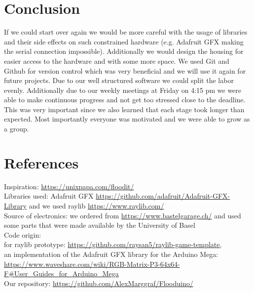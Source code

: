 \documentclass[10pt, a4paper]{article}
\begin{document}
\section*{Conclusion}

If we could start over again we would be more careful with the usage of libraries and their side effects on such constrained hardware (e.g. Adafruit GFX making the serial connection impossible). 
Additionally we would design the housing for easier access to the hardware and with some more space. We used Git and Github for version control which was very beneficial and we will use it again for future projects. Due to our well structured software we could split the labor evenly. Additionally due to our weekly meetings at Friday on 4:15 pm we were able to make continuous progress and not get too stressed close to the deadline. This was very important since we also learned that each stage took longer than expected. 
Most importantly everyone was motivated and we were able to grow as a group. 


\section*{References}
\label{sec:references}
Inspiration: \url{https://unixpapa.com/floodit/} \\
Libraries used: Adafruit GFX \url{https://github.com/adafruit/Adafruit-GFX-Library} and we used raylib \url{https://www.raylib.com/} \\
Source of electronics: we ordered from \url{https://www.bastelgarage.ch/} and used some parts that were made available by the University of Basel \\
Code origin: \\
for raylib prototype: \url{https://github.com/raysan5/raylib-game-template}, \\
an implementation of the Adafruit GFX library for the Arduino Mega: \url{https://www.waveshare.com/wiki/RGB-Matrix-P3-64x64-F#User_Guides_for_Arduino_Mega} \\
Our repository: \url{https://github.com/AlexMarggraf/Flooduino/}
\end{document}
